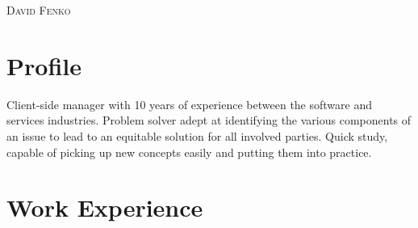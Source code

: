 \documentclass[a4paper, oneside, final]{scrartcl} %
\begin{document}
\begin{center} %


{\fontsize{24}{24}\selectfont\scshape David Fenko} %


\vspace{-5mm}


\section{Profile}

Client-side manager with 10 years of experience between the software and services industries. Problem solver adept at identifying the various components of an issue to  lead to an equitable solution for all involved parties. Quick study, capable of picking up new concepts easily and putting them into practice.\\



\section{Work Experience}


\end{center}
\end{document}
